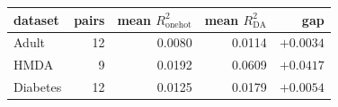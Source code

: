 \begin{tabular}{@{}l r r r r@{}}
\toprule
dataset & pairs & mean $R^2_{\mathrm{onehot}}$ & mean $R^2_{\mathrm{DA}}$ & gap \\
\midrule
Adult & 12 & 0.0080 & 0.0114 & $+0.0034$ \\
HMDA & 9 & 0.0192 & 0.0609 & $\mathbf{+0.0417}$ \\
Diabetes & 12 & 0.0125 & 0.0179 & $+0.0054$ \\
\bottomrule
\end{tabular}
